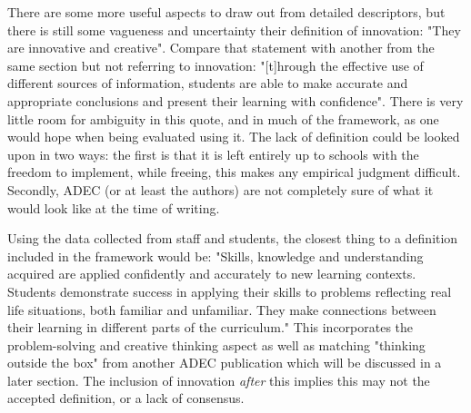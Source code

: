 There are some more useful aspects to draw out from detailed descriptors, but there is still some vagueness and uncertainty their definition of innovation: "They are innovative and creative". Compare that statement with another from the same section but not referring to innovation: "[t]hrough the effective use of different sources of information, students are able to make accurate and appropriate conclusions and present their learning with confidence". There is very little room for ambiguity in this quote, and in much of the framework, as one would hope when being evaluated using it. The lack of definition could be looked upon in two ways: the first is that it is left entirely up to schools with the freedom to implement, while freeing, this makes any empirical judgment difficult. Secondly, ADEC (or at least the authors) are not completely sure of what it would look like at the time of writing.

Using the data collected from staff and students, the closest thing to a definition included in the framework would be: "Skills, knowledge and understanding acquired are applied confidently and accurately to new learning contexts. Students demonstrate success in applying their skills to problems reflecting real life situations, both familiar and unfamiliar. They make connections between their learning in different parts of the curriculum." This incorporates the problem-solving and creative thinking aspect as well as matching "thinking outside the box" from another ADEC publication which will be discussed in a later section. The inclusion of innovation \textit{after} this implies this may not the accepted definition, or a lack of consensus.

